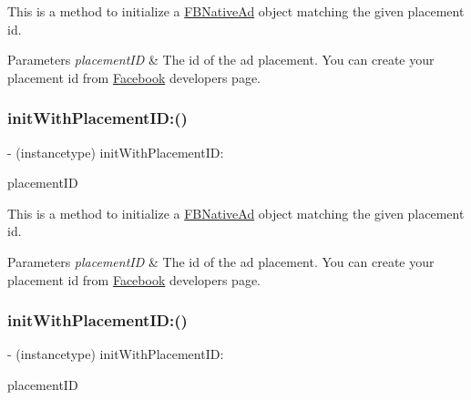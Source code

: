 This is a method to initialize a \hyperlink{interfaceFBNativeAd}{F\+B\+Native\+Ad} object matching the given placement id.


\begin{DoxyParams}{Parameters}
{\em placement\+ID} & The id of the ad placement. You can create your placement id from \hyperlink{interfaceFacebook}{Facebook} developers page. \\
\hline
\end{DoxyParams}
\mbox{\label{interfaceFBNativeAd_af90f836b1fae6e994657a1d1d3724922}} 
\subsubsection{\texorpdfstring{init\+With\+Placement\+I\+D\+:()}{initWithPlacementID:()}\hspace{0.1cm}{\footnotesize\ttfamily [3/5]}}
{\footnotesize\ttfamily -\/ (instancetype) init\+With\+Placement\+I\+D\+: \begin{DoxyParamCaption}\item[{(N\+S\+String $\ast$)}]{placement\+ID }\end{DoxyParamCaption}}

This is a method to initialize a \hyperlink{interfaceFBNativeAd}{F\+B\+Native\+Ad} object matching the given placement id.


\begin{DoxyParams}{Parameters}
{\em placement\+ID} & The id of the ad placement. You can create your placement id from \hyperlink{interfaceFacebook}{Facebook} developers page. \\
\hline
\end{DoxyParams}
\mbox{\label{interfaceFBNativeAd_af90f836b1fae6e994657a1d1d3724922}} 
\subsubsection{\texorpdfstring{init\+With\+Placement\+I\+D\+:()}{initWithPlacementID:()}\hspace{0.1cm}{\footnotesize\ttfamily [4/5]}}
{\footnotesize\ttfamily -\/ (instancetype) init\+With\+Placement\+I\+D\+: \begin{DoxyParamCaption}\item[{(N\+S\+String $\ast$)}]{placement\+ID }\end{DoxyParamCaption}}

